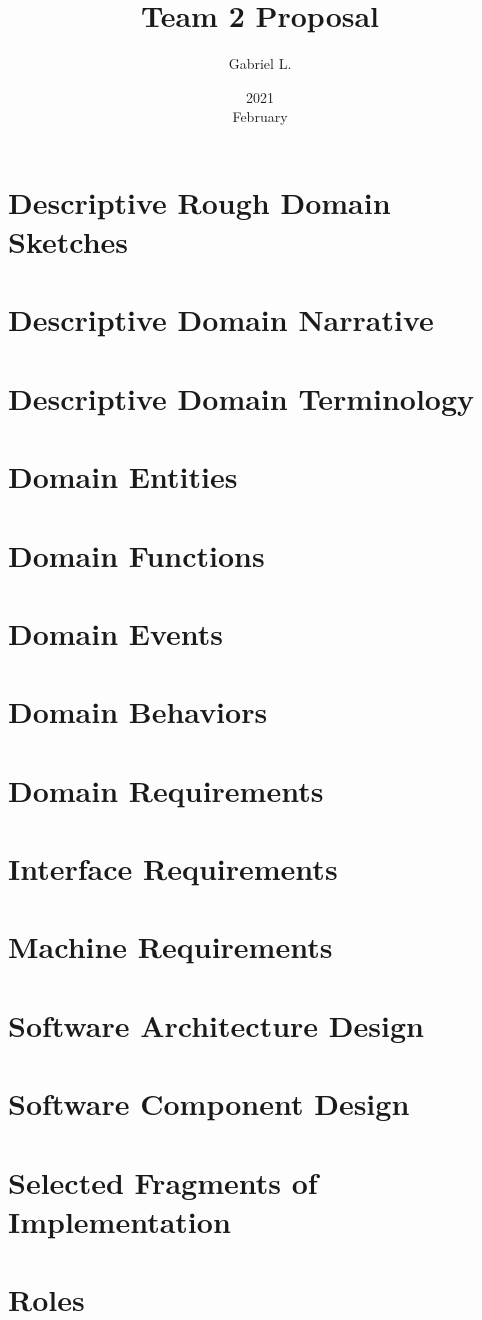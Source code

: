 \documentclass{article}
\title{Team 2 Proposal}
\date{2021 \\ February}
\author{Gabriel L.}
\begin{document}
\maketitle
\section{Descriptive Rough Domain Sketches}
\section{Descriptive Domain Narrative}
\section{Descriptive Domain Terminology}
\section{Domain Entities}
\section{Domain Functions}
\section{Domain Events}
\section{Domain Behaviors}
\section{Domain Requirements}
\section{Interface Requirements}
\section{Machine Requirements}
\section{Software Architecture Design}
\section{Software Component Design}
\section{Selected Fragments of Implementation}

\section{Roles}
\end{document}
